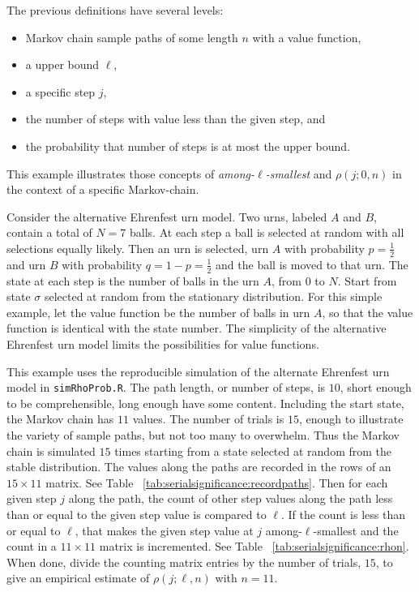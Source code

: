 \documentclass[12pt]{article}
\begin{document}
\begin{example}
    The previous definitions have several levels:
    \begin{itemize}
        \item
            Markov chain sample paths of some length \( n \) with a
            value function,
        \item
            a upper bound \( \ell \),
        \item
            a specific step \( j \),
        \item
            the number of steps with value less than the given step, and
        \item
            the probability that number of steps is at most the upper
            bound.
    \end{itemize}

    This example illustrates those concepts of \emph{among-\( \ell \)-smallest}
    and \( \rho(j; 0 ,n) \) in the context of a specific Markov-chain.

    Consider the alternative Ehrenfest urn model.%
    Two urns, labeled \( A \) and \( B \), contain a total of \( N = 7 \)
    balls.  At each step a ball is selected at random with all
    selections equally likely.  Then an urn is selected, urn \( A \)
    with probability \( p = \frac{1}{2} \) and urn \( B \) with
    probability \( q = 1-p = \frac {1}{2} \) and the ball is moved to
    that urn.  The state at each step is the number of balls in the urn \(
    A \), from \( 0 \) to \( N \).  Start from state \( \sigma \)
    selected at random from the stationary distribution. For this simple
    example, let the value function be the number of balls in urn \( A \),
    so that the value function is identical with the state number.  The
    simplicity of the alternative Ehrenfest urn model limits the
    possibilities for value functions.

    This example uses the reproducible simulation of the alternate
    Ehrenfest urn model in \texttt{simRhoProb.R}. The path length, or
    number of steps, is \( 10 \), short enough to be comprehensible,
    long enough have some content.  Including the start state, the
    Markov chain has \( 11 \) values. The number of trials is \( 15 \),
    enough to illustrate the variety of sample paths, but not too many
    to overwhelm. Thus the Markov chain is simulated \( 15 \) times
    starting from a state selected at random from the stable
    distribution.  The values along the paths are recorded in the rows
    of an \( 15 \times 11 \) matrix.  See Table~%
    \ref{tab:serialsignificance:recordpaths}. Then for each given step \(
    j \) along the path, the count of other step values along the path
    less than or equal to the given step value is compared to \( \ell \).
    If the count is less than or equal to \( \ell \), that makes the
    given step value at \( j \) among-\( \ell \)-smallest and the count
    in a \( 11 \times 11 \) matrix is incremented.  See Table~%
    \ref{tab:serialsignificance:rhon}.  When done, divide the counting
    matrix entries by the number of trials, \( 15 \), to give an
    empirical estimate of \( \rho(j; \ell ,n) \) with \( n = 11 \).


\end{example}
\end{document}
